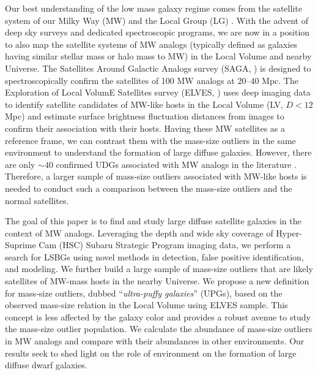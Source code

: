 \documentclass[twocolumn,astrosymb,twocolappendix]{aastex631}
\begin{document}
\begin{CJK*}{UTF8}{gbsn}
Our best understanding of the low mass galaxy regime comes from the satellite system of our Milky Way (MW) and the Local Group (LG) \citep[e.g.,][]{McConnachie2012,Simon2019}. With the advent of deep sky surveys and dedicated spectroscopic programs, we are now in a position to also map the satellite systems of MW analogs (typically defined as galaxies having similar stellar mass or halo mass to MW) in the Local Volume and nearby Universe. The Satellites Around Galactic Analogs survey (SAGA, \citealt{SAGA-I,SAGA-II}) is designed to spectroscopically confirm the satellites of 100 MW analogs at 20--40 Mpc. The Exploration of Local VolumE Satellites survey (ELVES,  \citealt{ELVES-I,ELVES-II,CarlstenELVES2022}) uses deep imaging data to identify satellite candidates of MW-like hosts in the Local Volume (LV, $D<12$ Mpc) and estimate surface brightness fluctuation distances from images to confirm their association with their hosts. Having these MW satellites as a reference frame, we can contrast them with the mass-size outliers in the same environment to understand the formation of large diffuse galaxies. However, there are only $\sim 40$ confirmed UDGs associated with MW analogs in the literature \citep{Roman2017b,Cohen2018,SAGA-II,CarlstenELVES2022,Nashimoto2022,Karunakaran2022b}. Therefore, a larger sample of mass-size outliers associated with MW-like hosts is needed to conduct such a comparison between the mass-size outliers and the normal satellites.

The goal of this paper is to find and study large diffuse satellite galaxies in the context of MW analogs. Leveraging the depth and wide sky coverage of Hyper-Suprime Cam (HSC) Subaru Strategic Program imaging data, we perform a search for LSBGs using novel methods in detection, false positive identification, and modeling. We further build a large sample of mass-size outliers that are likely satellites of MW-mass hosts in the nearby Universe. We propose a new definition for mass-size outliers, dubbed ``\textit{ultra-puffy galaxies}'' (UPGs), based on the observed mass-size relation in the Local Volume using ELVES sample. This concept is less affected by the galaxy color and provides a robust avenue to study the mass-size outlier population. 
We calculate the abundance of mass-size outliers in MW analogs and compare with their abundances in other environments. Our results seek to shed light on the role of environment on the formation of large diffuse dwarf galaxies. 


\end{CJK*}
\end{document}
